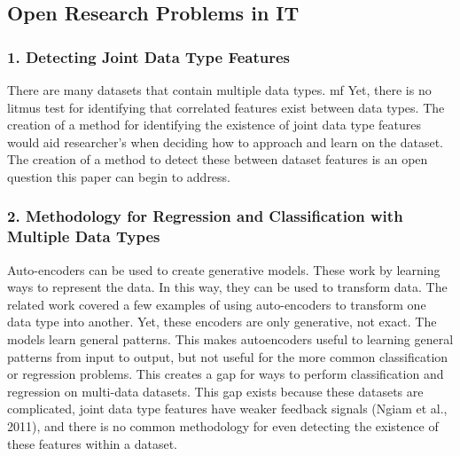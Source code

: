 \subsection{Open Research Problems in IT}

\subsubsection{1. Detecting Joint Data Type Features}
There are many datasets that contain multiple data types. mf Yet, there is no litmus test for identifying that correlated features exist between data types.  The creation of a method for identifying the existence of joint data type features would aid researcher's when deciding how to approach and learn on the dataset.  The creation of a method to detect these between dataset features is an open question this paper can begin to address.

\subsubsection{2. Methodology for Regression and Classification with Multiple Data Types}
Auto-encoders can be used to create generative models. These work by learning ways to represent the data.  In this way, they can be used to transform data.  The related work covered a few examples of using auto-encoders to transform one data type into another.  Yet, these encoders are only generative, not exact.  The models learn general patterns.  This makes autoencoders useful to learning general patterns from input to output, but not useful for the more common classification or regression problems.  This creates a gap for ways to perform classification and regression on multi-data datasets.  This gap exists because these datasets are complicated, joint data type features have weaker feedback signals (Ngiam et al., 2011), and there is no common methodology for even detecting the existence of these features within a dataset.  


